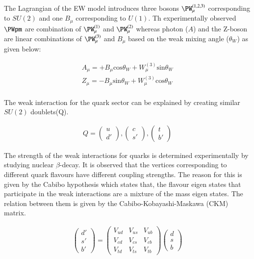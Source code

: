 The Lagrangian of the EW model introduces three bosons $\PW_\mu^{(1,2,3)}$ corresponding
to $SU(2)$ and one $B_\mu$ corresponding to $U(1)$. Th experimentally observed $\PWpm$
are combination of $\PW_\mu^{(1)}$ and $\PW_\mu^{(2)}$ whereas photon ($A$) and the Z-boson are linear
combinations of $\PW_\mu^{(3)}$ and $B_\mu$ based on the weak mixing angle ($\theta_W$)
as given below:

\begin{align*}
A_\mu = +B_\mu \text{cos} \theta_W + W_\mu^{(3)}\text{sin} \theta_W \\
Z_\mu = -B_\mu \text{sin} \theta_W + W_\mu^{(3)}\text{cos} \theta_W \\
\end{align*}

The weak interaction for the quark sector can be explained by creating similar
$SU(2)$ doublets(Q).

\begin{align*}
    Q = \begin{pmatrix} u \\ d' \end{pmatrix}, \begin{pmatrix} c \\ s' \end{pmatrix}, \begin{pmatrix} t \\ b' \end{pmatrix}
\end{align*}

The strength of the weak interactions for quarks is determined experimentally by studying
nuclear $\beta$-decay. It is observed that the vertices corresponding to different quark
flavours have different coupling strengths. The reason for this is given by the Cabibo
hypothesis which states that, the flavour eigen states that participate in the weak interactions
are a mixture of the mass eigen states. The relation between them is given by the 
Cabibo-Kobayashi-Maskawa (CKM) matrix. 

\begin{align*}
    \begin{pmatrix} d' \\ s' \\ b'\end{pmatrix}
     = \begin{pmatrix} V_{ud} & V_{us} & V_{ub} \\
                       V_{cd} & V_{cs} & V_{cb} \\
                       V_{td} & V_{ts} & V_{tb}
    \end{pmatrix} \begin{pmatrix} d \\ s \\ b\end{pmatrix}
\end{align*}

